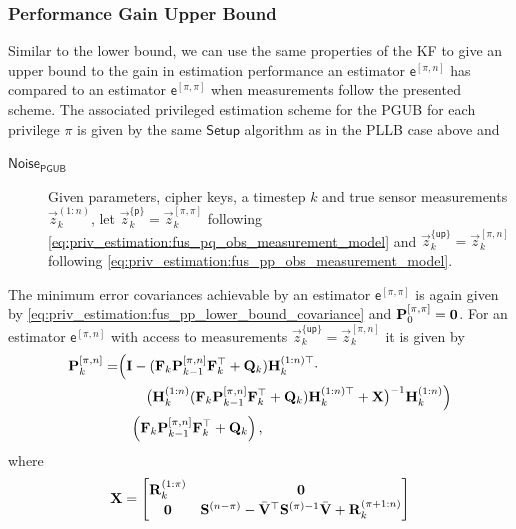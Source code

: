 \subsubsection{Performance Gain Upper Bound}
Similar to the lower bound, we can use the same properties of the KF to give an upper bound to the gain in estimation performance an estimator $\mathsf{e}^{[\pi,n]}$ has compared to an estimator $\mathsf{e}^{[\pi,\pi]}$ when measurements follow the presented scheme. The associated privileged estimation scheme for the PGUB for each privilege $\pi$ is given by the same $\mathsf{Setup}$ algorithm as in the PLLB case above and
\begin{description}
  \item[$\mathsf{Noise}_{\mathsf{PGUB}}$] Given parameters, cipher keys, a timestep $k$ and true sensor measurements $\vec{z}_k^{(1:n)}$, let $\vec{z}_k^{\{\mathsf{p}\}}=\vec{z}_k^{[\pi,\pi]}$ following \eqref{eq:priv_estimation:fus_pq_obs_measurement_model} and $\vec{z}_k^{\{\mathsf{up}\}}=\vec{z}_k^{[\pi,n]}$ following \eqref{eq:priv_estimation:fus_pp_obs_measurement_model}.
\end{description}
The minimum error covariances achievable by an estimator $\mathsf{e}^{[\pi,\pi]}$ is again given by \eqref{eq:priv_estimation:fus_pp_lower_bound_covariance} and ${{\mathbf{P}}}_0^{[\pi,\pi]} = {{\mathbf{0}}}$. For an estimator $\mathsf{e}^{[\pi,n]}$ with access to measurements $\vec{z}_k^{\{\mathsf{up}\}}=\vec{z}_k^{[\pi,n]}$ it is given by
\begin{equation}\label{eq:priv_estimation:fus_pn_lower_bound_covariance}
  \begin{split}
    {\ensuremath{{\mathbf{P}}}}_k^{[\pi,n]} =& \Bigl( {{\mathbf{I}}} - ({{\mathbf{F}}}_k{{\mathbf{P}}}_{k-1}^{[\pi,n]}{{\mathbf{F}}}_k^\top + {{\mathbf{Q}}}_k){{\mathbf{H}}}_k^{(1:n)\top} \cdot \\
    &\qquad\bigl({{\mathbf{H}}}_k^{(1:n)}({{\mathbf{F}}}_k{{\mathbf{P}}}_{k-1}^{[\pi,n]}{{\mathbf{F}}}_k^\top + {{\mathbf{Q}}}_k){{\mathbf{H}}}_k^{(1:n)\top}+ {{\mathbf{X}}}\bigr)^{-1}{{\mathbf{H}}}_k^{(1:n)}\Bigr)\\
    &\quad\Bigl({{\mathbf{F}}}_k{{\mathbf{P}}}_{k-1}^{[\pi,n]}{{\mathbf{F}}}_k^\top + {{\mathbf{Q}}}_k\Bigr)\,,
 \end{split}
\end{equation}
where
\begin{equation}
  {\ensuremath{{\mathbf{X}}}} = 
  \begin{bmatrix}
    {\ensuremath{{\mathbf{R}}}}_k^{(1:\pi)} & {{\mathbf{0}}}\\
    {{\mathbf{0}}} & {{\mathbf{S}}}^{(n-\pi)} - \bar{{{\mathbf{V}}}}^\top{\ensuremath{{\mathbf{S}}}}^{(\pi)-1}\bar{{{\mathbf{V}}}} + {{\mathbf{R}}}_k^{(\pi+1:n)}
  \end{bmatrix}
\end{equation}
